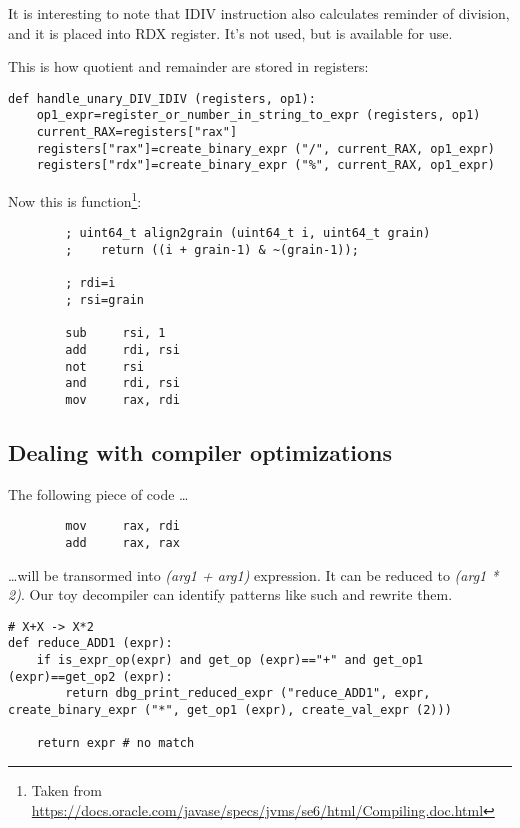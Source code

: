 

It is interesting to note that IDIV instruction also calculates reminder of division, and it is placed into RDX register.
It's not used, but is available for use.

This is how quotient and remainder are stored in registers:

\begin{lstlisting}
def handle_unary_DIV_IDIV (registers, op1):
    op1_expr=register_or_number_in_string_to_expr (registers, op1)
    current_RAX=registers["rax"]
    registers["rax"]=create_binary_expr ("/", current_RAX, op1_expr)
    registers["rdx"]=create_binary_expr ("%", current_RAX, op1_expr)
\end{lstlisting}

Now this is  function\footnote{Taken from \url{https://docs.oracle.com/javase/specs/jvms/se6/html/Compiling.doc.html}}:

\begin{lstlisting}
        ; uint64_t align2grain (uint64_t i, uint64_t grain)
        ;    return ((i + grain-1) & ~(grain-1));

        ; rdi=i
        ; rsi=grain

        sub     rsi, 1
        add     rdi, rsi
        not     rsi
        and     rdi, rsi
        mov     rax, rdi
\end{lstlisting}



\subsection{Dealing with compiler optimizations}

The following piece of code \dots

\begin{lstlisting}
        mov     rax, rdi
        add     rax, rax
\end{lstlisting}

\dots will be transormed into \textit{(arg1 + arg1)} expression.
It can be reduced to \textit{(arg1 * 2)}.
Our toy decompiler can identify patterns like such and rewrite them.

\begin{lstlisting}
# X+X -> X*2
def reduce_ADD1 (expr):
    if is_expr_op(expr) and get_op (expr)=="+" and get_op1 (expr)==get_op2 (expr):
        return dbg_print_reduced_expr ("reduce_ADD1", expr, create_binary_expr ("*", get_op1 (expr), create_val_expr (2)))

    return expr # no match
\end{lstlisting}

